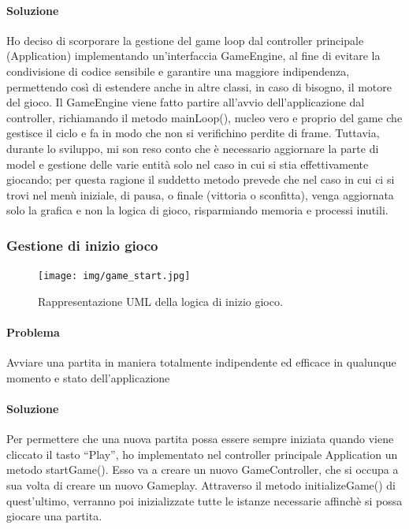 \documentclass[a4paper,12pt]{report}
\begin{document}
\paragraph{Soluzione} Ho deciso di scorporare la gestione del game loop dal controller principale (Application) implementando un’interfaccia GameEngine, al fine di evitare la condivisione di codice sensibile e garantire una maggiore indipendenza, permettendo così di estendere anche in altre classi, in caso di bisogno, il motore del gioco. Il GameEngine viene fatto partire all’avvio dell’applicazione dal controller, richiamando il metodo mainLoop(), nucleo vero e proprio del game che gestisce il ciclo e fa in modo che non si verifichino perdite di frame. Tuttavia, durante lo sviluppo, mi son reso conto che è necessario aggiornare la parte di model e gestione delle varie entità solo nel caso in cui si stia effettivamente giocando; per questa ragione il suddetto metodo prevede che nel caso in cui ci si trovi nel menù iniziale, di pausa, o finale (vittoria o sconfitta), venga aggiornata solo la grafica e non la logica di gioco, risparmiando memoria e processi inutili.

\subsubsection{Gestione di inizio gioco}

\begin{figure}[H]
\centering{}
\texttt{[image: img/game\_start.jpg]}
\caption{Rappresentazione UML della logica di inizio gioco.}
\end{figure}

\paragraph{Problema} Avviare una partita in maniera totalmente indipendente ed efficace in qualunque momento e stato dell’applicazione

\paragraph{Soluzione} Per permettere che una nuova partita possa essere sempre iniziata quando viene cliccato il tasto “Play”, ho implementato nel controller principale Application un metodo startGame(). Esso va a creare un nuovo GameController, che si occupa a sua volta di creare un nuovo Gameplay. Attraverso il metodo initializeGame() di quest’ultimo, verranno poi inizializzate tutte le istanze necessarie affinchè si possa giocare una partita.
\end{document}
